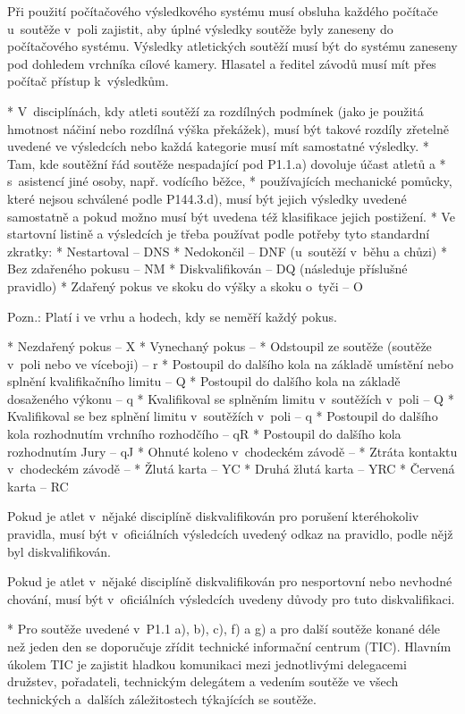 Při použití počítačového výsledkového systému musí obsluha každého počítače u~soutěže v~poli zajistit, aby úplné výsledky soutěže byly zaneseny do počítačového systému. Výsledky atletických soutěží musí být do systému zaneseny pod dohledem vrchníka cílové kamery. Hlasatel a ředitel závodů musí mít přes počítač přístup k~výsledkům.

* V~disciplínách, kdy atleti soutěží za rozdílných podmínek (jako je použitá hmotnost náčiní nebo rozdílná výška překážek), musí být takové rozdíly zřetelně uvedené ve výsledcích nebo každá kategorie musí mít samostatné výsledky.
* Tam, kde soutěžní řád soutěže nespadající pod P1.1.a) dovoluje účast atletů
  \begitems \style a
  * s~asistencí jiné osoby, např. vodícího běžce,
  * používajících mechanické pomůcky, které nejsou schválené podle P144.3.d),
  \enditems
musí být jejich výsledky uvedené samostatně a pokud možno musí být uvedena též klasifikace jejich postižení.
* Ve startovní listině a výsledcích je třeba používat podle potřeby tyto standardní zkratky:
  \begitems
  * Nestartoval -- DNS
  * Nedokončil -- DNF (u~soutěží v~běhu a chůzi)
  * Bez zdařeného pokusu -- NM
  * Diskvalifikován -- DQ (následuje příslušné pravidlo)
  * Zdařený pokus ve skoku do výšky a skoku o~tyči -- O

  Pozn.: Platí i ve vrhu a hodech, kdy se neměří každý pokus.

  * Nezdařený pokus -- X
  * Vynechaný pokus -- \uv{--}
  * Odstoupil ze soutěže (soutěže v~poli nebo ve víceboji) -- r
  * Postoupil do dalšího kola na základě umístění nebo splnění kvalifikačního limitu -- Q
  * Postoupil do dalšího kola na základě dosaženého výkonu -- q
  * Kvalifikoval se  splněním limitu v~soutěžích v~poli -- Q
  * Kvalifikoval se bez splnění limitu v~soutěžích v~poli -- q
  * Postoupil do dalšího kola rozhodnutím vrchního rozhodčího -- qR
  * Postoupil do dalšího kola rozhodnutím Jury -- qJ
  * Ohnuté koleno v~chodeckém závodě -- \uv{$>$}
  * Ztráta kontaktu v~chodeckém závodě -- \uv{$\sim$}
  * Žlutá karta -- YC
  * Druhá žlutá karta -- YRC
  * Červená karta -- RC
  \enditems

Pokud je atlet v~nějaké disciplíně diskvalifikován pro porušení kteréhokoliv pravidla, musí být v~oficiálních výsledcích uvedený odkaz na pravidlo, podle nějž byl diskvalifikován.

Pokud je atlet v~nějaké disciplíně diskvalifikován pro nesportovní nebo nevhodné chování, musí být v~oficiálních výsledcích uvedeny důvody pro tuto diskvalifikaci.

* Pro soutěže uvedené v~P1.1 a), b), c), f) a g) a pro další soutěže konané déle než jeden den se doporučuje zřídit technické informační centrum (TIC). Hlavním úkolem TIC je zajistit hladkou komunikaci mezi jednotlivými delegacemi družstev, pořadateli, technickým delegátem a vedením soutěže ve všech technických a~dalších záležitostech týkajících se soutěže.

